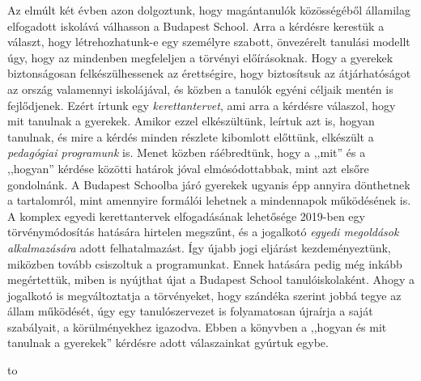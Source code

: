 Az elmúlt két évben azon dolgoztunk, hogy magántanulók közösségéből
államilag elfogadott iskolává válhasson a Budapest School. Arra a
kérdésre kerestük a választ, hogy létrehozhatunk-e egy személyre
szabott, önvezérelt tanulási modellt úgy, hogy az mindenben
megfeleljen a törvényi előírásoknak. Hogy a gyerekek biztonságosan
felkészülhessenek az érettségire, hogy biztosítsuk az átjárhatóságot
az ország valamennyi iskolájával, és közben a tanulók egyéni céljaik mentén is
fejlődjenek. Ezért írtunk egy \emph{kerettantervet}, ami arra a
kérdésre válaszol, hogy mit tanulnak a gyerekek. Amikor ezzel
elkészültünk, leírtuk azt is, hogyan tanulnak, és mire a kérdés minden
részlete kibomlott előttünk, elkészült a \emph{pedagógiai programunk}
is. Menet közben ráébredtünk, hogy a ,,mit'' és a ,,hogyan'' kérdése közötti
határok jóval elmósódottabbak, mint azt elsőre gondolnánk. A Budapest
Schoolba járó gyerekek ugyanis épp annyira dönthetnek a tartalomról,
mint amennyire formálói lehetnek a mindennapok működésének is. A
komplex egyedi kerettantervek elfogadásának lehetősége 2019-ben egy
törvénymódosítás hatására hirtelen megszűnt, és a jogalkotó
\emph{egyedi megoldások alkalmazására} adott felhatalmazást. Így
újabb jogi eljárást kezdeményeztünk, miközben tovább csiszoltuk a
programunkat. Ennek hatására pedig még inkább megértettük, miben is
nyújthat újat a Budapest School tanulóiskolaként. Ahogy a jogalkotó
is megváltoztatja a törvényeket, hogy szándéka szerint jobbá tegye az
állam működését, úgy egy tanulószervezet is folyamatosan újraírja a
saját szabályait, a körülményekhez igazodva. Ebben a könyvben a ,,hogyan
és mit tanulnak a gyerekek'' kérdésre adott válaszainkat gyúrtuk
egybe.

\baselineskip

\hbox to
